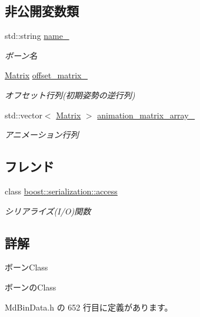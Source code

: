 \subsection*{非公開変数類}
\begin{DoxyCompactItemize}
\item 
std\+::string \mbox{\hyperlink{class_md_bin_data_1_1_mesh_1_1_bone_a3ed12325ffa278847429e758ec08a373}{name\+\_\+}}
\begin{DoxyCompactList}\small\item\em ボーン名 \end{DoxyCompactList}\item 
\mbox{\hyperlink{class_md_bin_data_1_1_matrix}{Matrix}} \mbox{\hyperlink{class_md_bin_data_1_1_mesh_1_1_bone_ab2119901317e2beb384a36d40f31c385}{offset\+\_\+matrix\+\_\+}}
\begin{DoxyCompactList}\small\item\em オフセット行列(初期姿勢の逆行列) \end{DoxyCompactList}\item 
std\+::vector$<$ \mbox{\hyperlink{class_md_bin_data_1_1_matrix}{Matrix}} $>$ \mbox{\hyperlink{class_md_bin_data_1_1_mesh_1_1_bone_a434b2abeb02434b44881e07a0eb7002e}{animation\+\_\+matrix\+\_\+array\+\_\+}}
\begin{DoxyCompactList}\small\item\em アニメーション行列 \end{DoxyCompactList}\end{DoxyCompactItemize}
\subsection*{フレンド}
\begin{DoxyCompactItemize}
\item 
class \mbox{\hyperlink{class_md_bin_data_1_1_mesh_1_1_bone_ac98d07dd8f7b70e16ccb9a01abf56b9c}{boost\+::serialization\+::access}}
\begin{DoxyCompactList}\small\item\em シリアライズ(I/O)関数 \end{DoxyCompactList}\end{DoxyCompactItemize}


\subsection{詳解}
ボーン\+Class 

ボーンの\+Class 

 Md\+Bin\+Data.\+h の 652 行目に定義があります。



